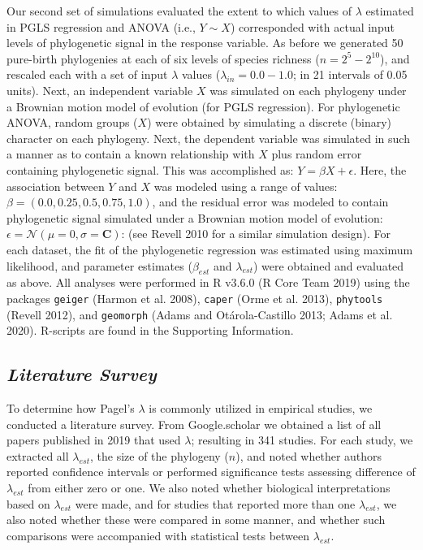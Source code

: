 \documentclass[
]{article}
\begin{document}
Our second set of simulations evaluated the extent to which values of
\(\lambda\) estimated in PGLS regression and ANOVA (i.e., \(Y\sim{X}\))
corresponded with actual input levels of phylogenetic signal in the
response variable. As before we generated 50 pure-birth phylogenies at
each of six levels of species richness (\(n=2^5 - 2^{10}\)), and
rescaled each with a set of input \(\lambda\) values
(\(\lambda_{in} = 0.0 - 1.0\); in 21 intervals of 0.05 units). Next, an
independent variable \(X\) was simulated on each phylogeny under a
Brownian motion model of evolution (for PGLS regression). For
phylogenetic ANOVA, random groups (\(X\)) were obtained by simulating a
discrete (binary) character on each phylogeny. Next, the dependent
variable was simulated in such a manner as to contain a known
relationship with \(X\) plus random error containing phylogenetic
signal. This was accomplished as: \(Y=\beta{X}+\epsilon\). Here, the
association between \(Y\) and \(X\) was modeled using a range of values:
\(\beta=(0.0,0.25, 0.5, 0.75,1.0)\), and the residual error was modeled
to contain phylogenetic signal simulated under a Brownian motion model
of evolution: \(\epsilon=\mathcal{N}(\mu=0,\sigma=\mathbf{C})\): (see
Revell 2010 for a similar simulation design). For each dataset, the fit
of the phylogenetic regression was estimated using maximum likelihood,
and parameter estimates (\(\beta_{est}\) and \(\lambda_{est}\)) were
obtained and evaluated as above. All analyses were performed in R v3.6.0
(R Core Team 2019) using the packages \texttt{geiger} (Harmon et al.
2008), \texttt{caper} (Orme et al. 2013), \texttt{phytools} (Revell
2012), and \texttt{geomorph} (Adams and Otárola-Castillo 2013; Adams et
al. 2020). R-scripts are found in the Supporting Information.

\hypertarget{literature-survey}{%
\subsection{\texorpdfstring{\emph{Literature
Survey}}{Literature Survey}}\label{literature-survey}}

To determine how Pagel's \(\lambda\) is commonly utilized in empirical
studies, we conducted a literature survey. From Google.scholar we
obtained a list of all papers published in 2019 that used \(\lambda\);
resulting in 341 studies. For each study, we extracted all
\(\lambda_{est}\), the size of the phylogeny (\(n\)), and noted whether
authors reported confidence intervals or performed significance tests
assessing difference of \(\lambda_{est}\) from either zero or one. We
also noted whether biological interpretations based on \(\lambda_{est}\)
were made, and for studies that reported more than one
\(\lambda_{est}\), we also noted whether these were compared in some
manner, and whether such comparisons were accompanied with statistical
tests between \(\lambda_{est}\). \hfill\break
\end{document}
